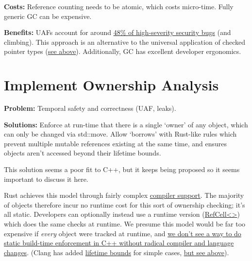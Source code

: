 \documentclass[a4paper,12pt,notitlepage,twoside,openright]{article}
\begin{document}
\textbf{Costs:} Reference counting needs to be atomic, which costs
micro-time. Fully generic GC can be expensive.

\textbf{Benefits:} UAFs account for
around \href{https://docs.google.com/document/d/e/2PACX-1vRZr-HJcYmf2Y76DhewaiJOhRNpjGHCxliAQTBhFxzv1QTae9o8mhBmDl32CRIuaWZLt5kVeH9e9jXv/pub\#h.eoikp3r0cwlf}{48\%
of high-severity security bugs} (and climbing). This approach is an
alternative to the universal application of checked pointer types
(\href{https://docs.google.com/document/d/e/2PACX-1vRZr-HJcYmf2Y76DhewaiJOhRNpjGHCxliAQTBhFxzv1QTae9o8mhBmDl32CRIuaWZLt5kVeH9e9jXv/pub\#h.c3notccb295u}{see
above}). Additionally, GC has excellent developer ergonomics.

\section{Implement Ownership Analysis}

\textbf{Problem:} Temporal safety and correctness (UAF, leaks).

\textbf{Solutions:} Enforce at run-time that there is a single `owner'
of any object, which can only be changed via std::move. Allow `borrows'
with Rust-like rules which prevent multiple mutable references existing
at the same time, and ensures objects aren't accessed beyond their
lifetime bounds.

This solution seems a poor fit to C++, but it keeps being proposed so it
seems important to discuss it here.

Rust achieves this model through fairly
complex \href{https://www.google.com/url?q=https://doc.rust-lang.org/edition-guide/rust-2018/ownership-and-lifetimes/non-lexical-lifetimes.html\&sa=D\&source=editors\&ust=1631944129045000\&usg=AOvVaw0Sc7SumvQIHrlzjTV7oqUB}{compiler
support}. The majority of objects therefore incur no runtime cost for
this sort of ownership checking; it's all static. Developers can
optionally instead use a runtime version
(\href{https://www.google.com/url?q=https://doc.rust-lang.org/std/cell/struct.RefCell.html\&sa=D\&source=editors\&ust=1631944129045000\&usg=AOvVaw2-AksYW18PTZd07aOxYU5o}{RefCell\textless\textgreater{}})
which does the same checks at runtime. We presume this model would be
far too expensive if \emph{every} object were tracked at runtime,
and \href{https://www.google.com/url?q=https://docs.google.com/document/d/1oVTxJ-4VItkcA7rAMylIW74SOmKsnc4aS6bylr1B8ZY/edit?resourcekey\%3D0-RNrtKRt8CQ_BgGdGzrDwUA\&sa=D\&source=editors\&ust=1631944129046000\&usg=AOvVaw1vKF2_PTEYFrWd4ikG4Sf1}{we
don't see a way to do static build-time enforcement in C++ without
radical compiler and language changes}. (Clang has
added \href{https://www.google.com/url?q=https://reviews.llvm.org/rL338464\&sa=D\&source=editors\&ust=1631944129046000\&usg=AOvVaw0A8ddFZa3y3m3AXUyQIMD0}{lifetime
bounds} for simple
cases, \href{https://docs.google.com/document/d/e/2PACX-1vRZr-HJcYmf2Y76DhewaiJOhRNpjGHCxliAQTBhFxzv1QTae9o8mhBmDl32CRIuaWZLt5kVeH9e9jXv/pub\#h.j8svxi9w9c1i}{but
see above}).
\end{document}
